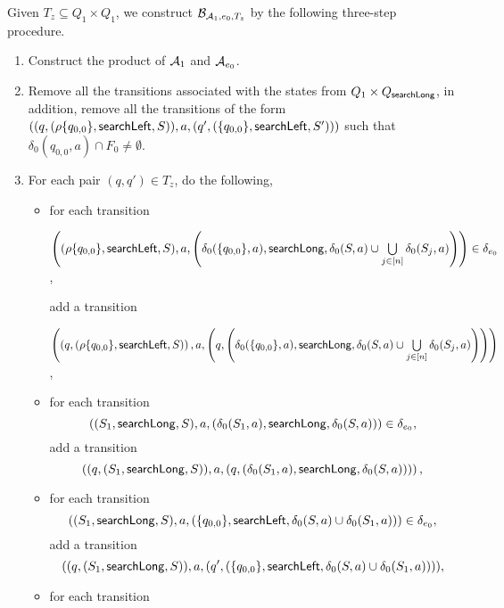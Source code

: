 

Given $T_z \subseteq Q_1 \times Q_1$, we construct $\mathcal{B}_{\mathcal{A}_1, e_0,  T_{z}}$ by  the following three-step procedure.
\begin{enumerate}
\item Construct the product of $\mathcal{A}_1$ and $\mathcal{A}_{e_0}$. 

\item Remove all the transitions associated with the states from $Q_1 \times Q_{\mathsf{searchLong}}$, in addition, remove all the transitions of the form $((q, (\rho\{q_{0,0}\}, \mathsf{searchLeft}, S)), a, (q', (\{q_{0,0}\}, \mathsf{searchLeft},S')))$ such that $\delta_0(q_{0,0},a) \cap F_0 \neq \emptyset$.

\item For each pair $(q,q') \in T_{z}$, do the following,
\begin{itemize}
\item for each transition

\medskip

$\left((\rho \{q_{0,0}\}, \mathsf{searchLeft}, S), a, \left(\delta_0(\{q_{0,0}\}, a), \mathsf{searchLong}, \delta_0(S, a) \cup \bigcup \limits_{j \in [n]} \delta_0(S_j, a) \right) \right) \in \delta_{e_0}$,

\medskip

add a transition

\medskip

$\left( \left(q, (\rho \{q_{0,0}\}, \mathsf{searchLeft}, S) \right), a, \left(q, \left(\delta_0(\{q_{0,0}\}, a), \mathsf{searchLong}, \delta_0(S, a) \cup \bigcup \limits_{j \in [n]} \delta_0(S_j, a) \right) \right) \right)$,

\medskip

%
\item for each transition
		$$((S_1, \mathsf{searchLong}, S), a, (\delta_0(S_1,a), \mathsf{searchLong}, \delta_0(S,a))) \in \delta_{e_0},$$
add a transition 
$$\left((q, (S_1, \mathsf{searchLong}, S)), a, (q, (\delta_0(S_1,a), \mathsf{searchLong}, \delta_0(S,a))) \right),$$
%
\item for each transition
		$$((S_1, \mathsf{searchLong}, S), a, (\{q_{0,0}\}, \mathsf{searchLeft}, \delta_0(S,a) \cup \delta_0(S_1,a))) \in \delta_{e_0},$$
add a transition
		$$((q, (S_1, \mathsf{searchLong}, S)), a, (q', (\{q_{0,0}\}, \mathsf{searchLeft}, \delta_0(S,a) \cup \delta_0(S_1,a)))),$$
%
\item for each transition


\end{itemize}
\end{enumerate}
